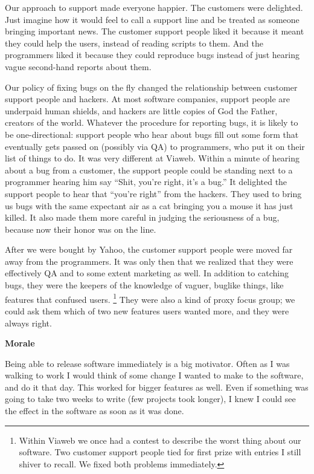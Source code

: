 Our approach to support made everyone happier. The customers were
delighted. Just imagine how it would feel to call a support line and be
treated as someone bringing important news. The customer support people
liked it because it meant they could help the users, instead of reading
scripts to them. And the programmers liked it because they could
reproduce bugs instead of just hearing vague second-hand reports about
them.

Our policy of fixing bugs on the fly changed the relationship between
customer support people and hackers. At most software companies, support
people are underpaid human shields, and hackers are little copies of God
the Father, creators of the world. Whatever the procedure for reporting
bugs, it is likely to be one-directional: support people who hear about
bugs fill out some form that eventually gets passed on (possibly via QA)
to programmers, who put it on their list of things to do. It was very
different at Viaweb. Within a minute of hearing about a bug from a
customer, the support people could be standing next to a programmer
hearing him say ``Shit, you're right, it's a bug.'' It delighted the
support people to hear that ``you're right'' from the hackers. They used
to bring us bugs with the same expectant air as a cat bringing you a
mouse it has just killed. It also made them more careful in judging the
seriousness of a bug, because now their honor was on the line.

After we were bought by Yahoo, the customer support people were moved
far away from the programmers. It was only then that we realized that
they were effectively QA and to some extent marketing as well. In
addition to catching bugs, they were the keepers of the knowledge of
vaguer, buglike things, like features that confused users. \footnote{Within Viaweb we once had a contest to describe the worst thing
about our software. Two customer support people tied for first prize
with entries I still shiver to recall. We fixed both problems
immediately.} They
were also a kind of proxy focus group; we could ask them which of two
new features users wanted more, and they were always right.

\textbf{Morale}

Being able to release software immediately is a big motivator. Often as
I was walking to work I would think of some change I wanted to make to
the software, and do it that day. This worked for bigger features as
well. Even if something was going to take two weeks to write (few
projects took longer), I knew I could see the effect in the software as
soon as it was done.

